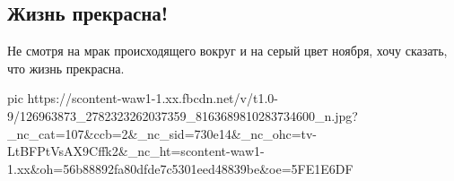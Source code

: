  
 
 
 
 
 
\subsection{Жизнь прекрасна!}
\label{sec:22_11_2020.fb.gimmiri_ana.1.zhizn_prekrasna}

Не смотря на мрак происходящего вокруг и на серый цвет ноября, хочу сказать,
что жизнь прекрасна.

\ifcmt
pic https://scontent-waw1-1.xx.fbcdn.net/v/t1.0-9/126963873_2782323262037359_8163689810283734600_n.jpg?_nc_cat=107&ccb=2&_nc_sid=730e14&_nc_ohc=tv-LtBFPtVsAX9Cffk2&_nc_ht=scontent-waw1-1.xx&oh=56b88892fa80dfde7c5301eed48839be&oe=5FE1E6DF
\fi
